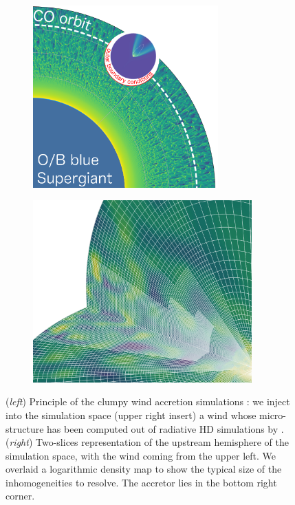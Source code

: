 \documentclass[a4paper,12pt,onecolumn]{article}
\begin{document}
\begin{figure}[!b]
\begin{subfigure}{0.45\columnwidth}
  \centering
  \includegraphics[height=7cm]{Figures/config_SgXB_clumps.png}	
\end{subfigure}%
\begin{subfigure}{0.45\columnwidth}
  \centering
  \hspace*{0.25cm}
  \includegraphics[height=7cm]{Figures/mesh.jpeg}	
\end{subfigure}
\caption{(\textit{left}) Principle of the clumpy wind accretion simulations : we inject into the simulation space (upper right insert) a wind whose micro-structure has been computed out of radiative HD simulations by \cite{Sundqvist2017}. (\textit{right}) Two-slices representation of the upstream hemisphere of the simulation space, with the wind coming from the upper left. We overlaid a logarithmic density map to show the typical size of the inhomogeneities to resolve. The accretor lies in the bottom right corner.}
\label{fig:config_SgXB_and_mesh}
\end{figure}
\end{document}
